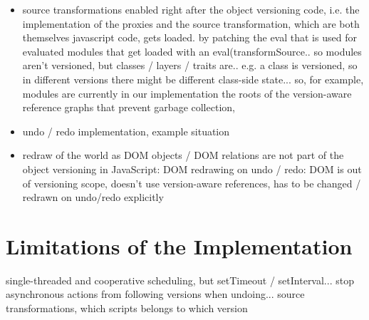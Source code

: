 \begin{itemize}
    \item source transformations enabled right after the object versioning code, i.e. the implementation of the proxies and the source transformation, which are both themselves javascript code, gets loaded. by patching the eval that is used for evaluated modules that get loaded with an eval(transformSource.. so modules aren’t versioned, but classes / layers / traits are.. e.g. a class is versioned, so in different versions there might be different class-side state... so, for example, modules are currently in our implementation the roots of the version-aware reference graphs that prevent garbage collection, 
\end{itemize}


\begin{itemize}
    \item undo / redo implementation, example situation
    \item redraw of the world as DOM objects / DOM relations are not part of the object versioning in JavaScript: DOM redrawing on undo / redo: DOM is out of versioning scope, doesn’t use version-aware references, has to be changed / redrawn on undo/redo explicitly
    
\end{itemize}






\section{Limitations of the Implementation}




single-threaded and cooperative scheduling, but setTimeout / setInterval... stop asynchronous actions from following versions when undoing... source transformations, which scripts belongs to which version



